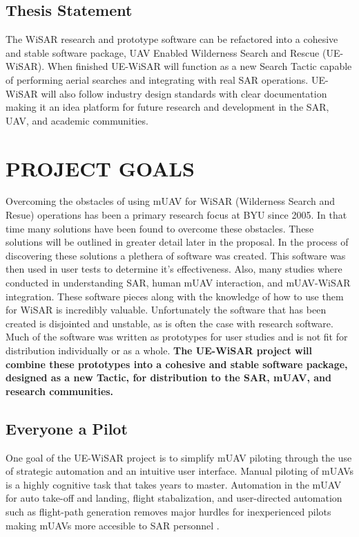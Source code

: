 \subsection{Thesis Statement}
The WiSAR research and prototype software can be refactored into a cohesive
and stable software package, UAV Enabled Wilderness Search and Rescue
(UE-WiSAR).
When finished UE-WiSAR will function as a new Search Tactic capable of performing aerial searches and integrating
with real SAR operations.
UE-WiSAR will also follow industry design standards with clear documentation
making it an idea platform for future research and development in the SAR, UAV,
and academic communities.

\section{PROJECT GOALS}
Overcoming the obstacles of using mUAV for WiSAR (Wilderness Search and Resue)
operations has been a primary research focus at BYU since 2005.  In that time many solutions have been found
to overcome these obstacles.  These solutions will be outlined in greater detail
later in the proposal.  In the process of discovering these solutions a plethera
of software was created.  This software was then used in user tests to determine
it's effectiveness.  Also, many studies where conducted in understanding SAR,
human mUAV interaction, and mUAV-WiSAR integration.  These software pieces along
with the knowledge of how to use them for WiSAR is incredibly valuable. 
Unfortunately the software that has been created is disjointed and unstable, as
is often the case with research software.
Much of the software was written as prototypes for user studies and is not fit
for distribution individually or as a whole.  \textbf{The UE-WiSAR project will
combine these prototypes into a cohesive and stable software package, designed
as a new Tactic, for distribution to the SAR, mUAV, and research communities.}

\subsection{Everyone a Pilot}
One goal of the UE-WiSAR project is to simplify mUAV piloting through the use of
strategic automation and an intuitive user interface.  Manual piloting of mUAVs
is a highly cognitive task that takes years to master.  Automation in the mUAV
for auto take-off and landing, flight stabalization, and user-directed
automation such as flight-path generation removes major hurdles for
inexperienced pilots making mUAVs more accesible to SAR personnel
\cite{cooper2007supporting}.

